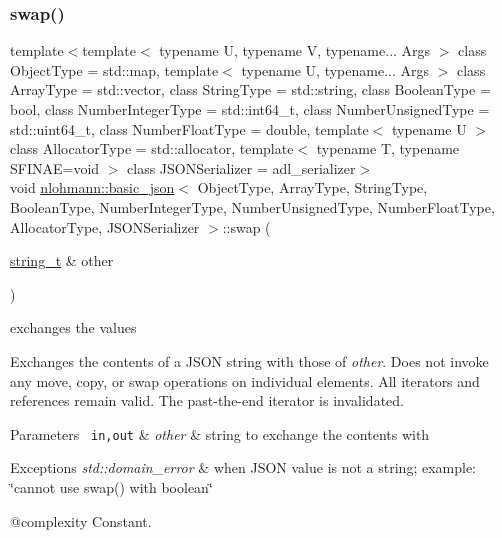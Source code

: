 \subsubsection{\texorpdfstring{swap()}{swap()}\hspace{0.1cm}{\footnotesize\ttfamily [4/4]}}
{\footnotesize\ttfamily template$<$template$<$ typename U, typename V, typename... Args $>$ class Object\+Type = std\+::map, template$<$ typename U, typename... Args $>$ class Array\+Type = std\+::vector, class String\+Type  = std\+::string, class Boolean\+Type  = bool, class Number\+Integer\+Type  = std\+::int64\+\_\+t, class Number\+Unsigned\+Type  = std\+::uint64\+\_\+t, class Number\+Float\+Type  = double, template$<$ typename U $>$ class Allocator\+Type = std\+::allocator, template$<$ typename T, typename S\+F\+I\+N\+A\+E=void $>$ class J\+S\+O\+N\+Serializer = adl\+\_\+serializer$>$ \\
void \mbox{\hyperlink{classnlohmann_1_1basic__json}{nlohmann\+::basic\+\_\+json}}$<$ Object\+Type, Array\+Type, String\+Type, Boolean\+Type, Number\+Integer\+Type, Number\+Unsigned\+Type, Number\+Float\+Type, Allocator\+Type, J\+S\+O\+N\+Serializer $>$\+::swap (\begin{DoxyParamCaption}\item[{\mbox{\hyperlink{classnlohmann_1_1basic__json_a61f8566a1a85a424c7266fb531dca005}{string\+\_\+t}} \&}]{other }\end{DoxyParamCaption})\hspace{0.3cm}{\ttfamily [inline]}}



exchanges the values 

Exchanges the contents of a J\+S\+ON string with those of {\itshape other}. Does not invoke any move, copy, or swap operations on individual elements. All iterators and references remain valid. The past-\/the-\/end iterator is invalidated.


\begin{DoxyParams}[1]{Parameters}
\mbox{\texttt{ in,out}}  & {\em other} & string to exchange the contents with\\
\hline
\end{DoxyParams}

\begin{DoxyExceptions}{Exceptions}
{\em std\+::domain\+\_\+error} & when J\+S\+ON value is not a string; example\+: {\ttfamily \char`\"{}cannot
use swap() with boolean\char`\"{}}\\
\hline
\end{DoxyExceptions}
@complexity Constant.

